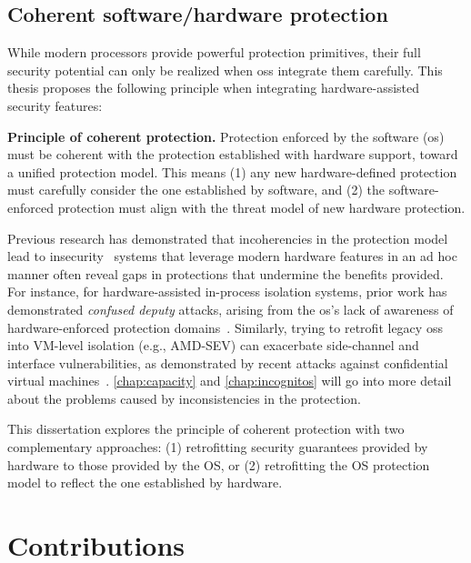 \subsection{Coherent software/hardware protection}

While modern processors provide powerful protection primitives, their full security potential can only be realized when \glspl{os} integrate them carefully.
This thesis proposes the following principle when integrating hardware-assisted security features:

\begin{displayquote}
	\textbf{Principle of coherent protection.} Protection enforced by the software (\gls{os}) must be coherent with the protection established with hardware support, toward a unified protection model.
	This means (1) any new hardware-defined protection must carefully consider the one established by software, and (2) the software-enforced protection must align with the threat model of new hardware protection.
\end{displayquote}

Previous research has demonstrated that incoherencies in the protection model lead to insecurity \dash\ systems that leverage modern hardware features in an ad hoc manner often reveal gaps in protections that undermine the benefits provided.
For instance, for hardware-assisted in-process isolation systems, prior work has demonstrated \emph{confused deputy} attacks, arising from the \gls{os}'s lack of awareness of hardware-enforced protection domains~\cite{pku-pitfalls,jenny}.
Similarly, trying to retrofit legacy \glspl{os} into VM-level isolation (e.g., AMD-SEV) can exacerbate side-channel and interface vulnerabilities, as demonstrated by recent attacks against confidential virtual machines~\cite{wesee,heckler,ciphersteal,li2021cipherleaks}.
\cref{chap:capacity} and \cref{chap:incognitos} will go into more detail about the problems caused by inconsistencies in the protection.

This dissertation explores the principle of coherent protection with two complementary approaches:
(1) retrofitting security guarantees provided by hardware to those provided by the OS, or (2) retrofitting the OS protection model to reflect the one established by hardware.

\clearpage

\section{Contributions}

